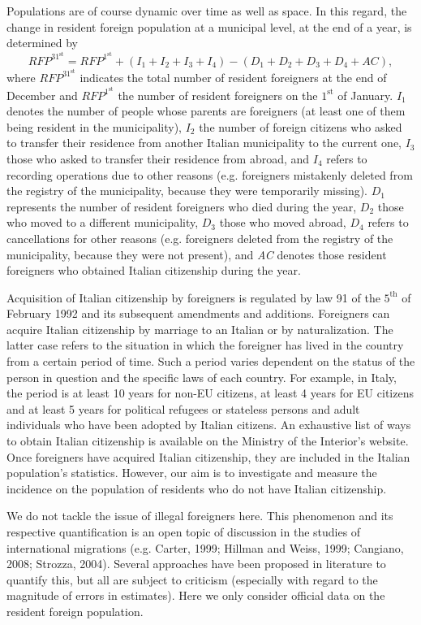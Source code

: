 \documentclass[12pt]{article}
\theoremstyle{definition}
\theoremstyle{plain}
\begin{document}
Populations are of course dynamic over time as well as space. In this regard, the change in resident foreign population at a municipal level, at the end of a year, is determined by
$$
RFP^{31^\text{st}} = RFP^{1^\text{st}} + (I_1 + I_2 + I_3+ I_4) - (D_1 + D_2 + D_3 + D_4 + AC),
$$ 
where $RFP^{31^\text{st}}$ indicates the total number of resident foreigners at the end of December and $RFP^{1^\text{st}}$ the number of resident foreigners on the $1^\text{st}$ of January. $I_{1}$ denotes the number of people whose parents are foreigners (at least one of them being resident in the municipality), $I_{2}$ the number of foreign citizens who asked to transfer their residence from another Italian municipality to the current one, $I_{3}$ those who asked to transfer their residence from abroad, and $I_{4}$ refers to recording operations due to other reasons (e.g. foreigners mistakenly deleted from the registry of the municipality, because they were temporarily missing). $D_{1}$ represents the number of resident foreigners who died during the year, $D_{2}$ those who moved to a different municipality, $D_{3}$ those who moved abroad, $D_{4}$ refers to cancellations for other reasons (e.g. foreigners deleted from the registry of the municipality, because they were not present), and \textit{AC} denotes those resident foreigners who obtained Italian citizenship during the year. 

Acquisition of Italian citizenship by foreigners is regulated by law 91 of the $5^\text{th}$ of February 1992 and its subsequent amendments and additions. Foreigners can acquire Italian citizenship by marriage to an Italian or by naturalization. The latter case refers to the situation in which the foreigner has lived in the country from a certain period of time. Such a period varies dependent on the status of the person in question and the specific laws of each country. For example, in Italy, the period is at least 10 years for non-EU citizens, at least 4 years for EU citizens and at least 5 years for political refugees or stateless persons and adult individuals who have been adopted by Italian citizens. An exhaustive list of ways to obtain Italian citizenship is available on the Ministry of the Interior's website. Once foreigners have acquired Italian citizenship, they are included in the Italian population's statistics. However, our aim is to investigate and measure the incidence on the population of  residents who do not have Italian citizenship.

We do not tackle the issue of illegal foreigners here. This phenomenon and its respective quantification is an open topic of discussion in the studies of international migrations (e.g. Carter, 1999; Hillman and Weiss, 1999; Cangiano, 2008; Strozza, 2004). Several approaches have been proposed in literature to quantify this, but all are subject to criticism (especially with regard to the magnitude of errors in estimates). Here we only consider official data on the resident foreign population. 
\end{document}
